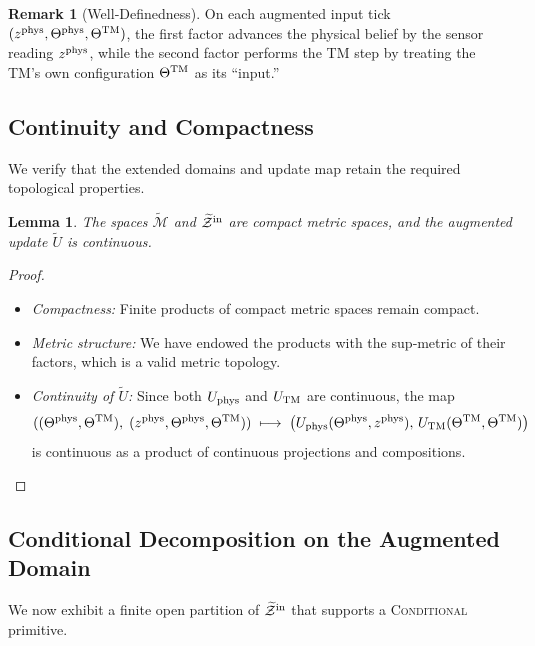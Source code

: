 \documentclass[12pt]{article}
\theoremstyle{definition}
\newtheorem{remark}{Remark}[section]
\theoremstyle{plain}
\newtheorem{lemma}{Lemma}[section]
\begin{document}
\begin{remark}[Well‑Definedness]
On each augmented input tick \((z^{\rm phys},\Theta^{\rm phys},\Theta^{\rm TM})\), the first factor advances the physical belief by the sensor reading \(z^{\rm phys}\), while the second factor performs the TM step by treating the TM’s own configuration \(\Theta^{\rm TM}\) as its “input.”
\end{remark}

\subsection{Continuity and Compactness}
\label{subsec:augmented-continuity-compactness}

We verify that the extended domains and update map retain the required topological properties.

\begin{lemma}
\label{lem:augmented-continuity}
The spaces \(\widetilde{\mathcal M}\) and \(\widetilde{\mathcal Z}^{\rm in}\) are compact metric spaces, and the augmented update
\(\widetilde U\) is continuous.
\end{lemma}

\begin{proof}
\begin{itemize}
  \item \emph{Compactness:} Finite products of compact metric spaces remain compact.
  \item \emph{Metric structure:} We have endowed the products with the sup‐metric of their factors, which is a valid metric topology.
  \item \emph{Continuity of \(\widetilde U\):} Since both
    \(U_{\rm phys}\) and \(U_{\rm TM}\) are continuous, the map
    \[
      ((\Theta^{\rm phys},\Theta^{\rm TM}),\;(z^{\rm phys},\Theta^{\rm phys},\Theta^{\rm TM}))
      \;\longmapsto\;
      \bigl(U_{\rm phys}(\Theta^{\rm phys},z^{\rm phys}),\,U_{\rm TM}(\Theta^{\rm TM},\Theta^{\rm TM})\bigr)
    \]
    is continuous as a product of continuous projections and compositions.  
\end{itemize}
\end{proof}


\subsection{Conditional Decomposition on the Augmented Domain}
\label{subsec:augmented-conditional-decomp}

We now exhibit a finite open partition of \(\widetilde{\mathcal Z}^{\rm in}\) that supports a \textsc{Conditional} primitive.
\end{document}
